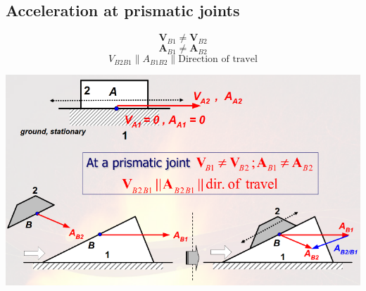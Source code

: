 \documentclass[11pt]{article}
\begin{document}
\subsection{Acceleration at prismatic joints}
\label{sec:orgc61eabe}
\[\boldsymbol{V}_{B1} \ne \boldsymbol{V}_{B2}\]
\[\boldsymbol{A}_{B1} \ne \boldsymbol{A}_{B2}\]
\[V_{B2B1} \parallel A_{B1B2} \parallel \text{Direction of travel}\]

\begin{center}
\includegraphics[width=.9\linewidth]{./images/acceleration-at-prismatic-joints.png}
\end{center}

 \newpage
\end{document}
